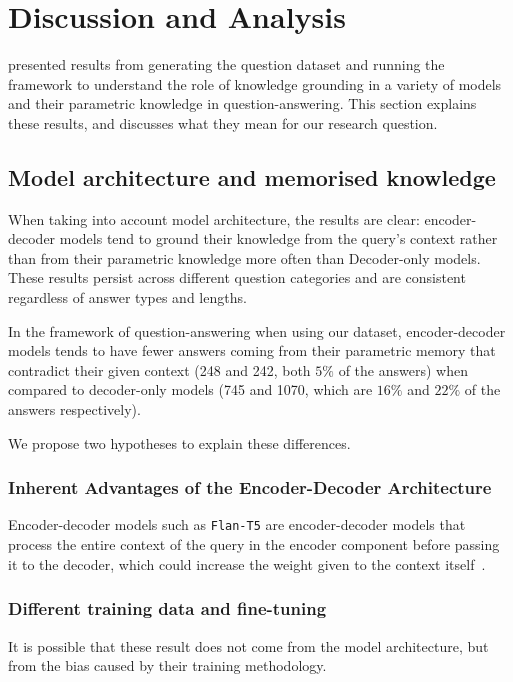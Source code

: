 \section{Discussion and Analysis}
\label{discussion}

 presented results from generating the question dataset and running the framework to understand the role of knowledge grounding in a variety of models and their parametric knowledge in question-answering.
This section explains these results, and discusses what they mean for our research question.

\subsection{Model architecture and memorised knowledge}
\label{model_architecture_parametric}

When taking into account model architecture, the results are clear: encoder-decoder models tend to ground their knowledge from the query's context rather than from their parametric knowledge more often than Decoder-only models.
These results persist across different question categories and are consistent regardless of answer types and lengths.

In the framework of question-answering when using our dataset, encoder-decoder models tends to have fewer answers coming from their parametric memory that contradict their given context (248 and 242, both $5\%$ of the answers) when compared to decoder-only models (745 and 1070, which are $16\%$ and $22\%$ of the answers respectively).

We propose two hypotheses to explain these differences.

\subsubsection{Inherent Advantages of the Encoder-Decoder Architecture}

Encoder-decoder models such as \texttt{Flan-T5} are encoder-decoder models that process the entire context of the query in the encoder component before passing it to the decoder, which could increase the weight given to the context itself~\cite{flant5}.

\subsubsection{Different training data and fine-tuning}

It is possible that these result does not come from the model architecture, but from the bias caused by their training methodology.

